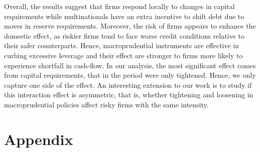 \documentclass[12pt]{article}
\begin{document}
	Overall, the results suggest that firms respond locally to changes in capital requirements while multinationals have an extra incentive to shift debt due to moves in reserve requirements. Moreover, the risk of firms appears to enhance the domestic effect, as riskier firms tend to face worse credit conditions relative to their safer counterparts. Hence, macroprudential instruments are effective in curbing excessive leverage and their effect are stronger to firms more likely to experience shortfall in cash-flow. In our analysis, the most significant effect comes from capital requirements, that in the period were only tightened. Hence, we only capture one side of the effect. An interesting extension to our work is to study if this interaction effect is asymmetric, that is, whether tightening and loosening in macroprudential policies affect risky firms with the same intensity.
	
		
	\clearpage
	
	\singlespacing
	
	
	
	
	
	
	

	
	\clearpage
	
\section*{Appendix } 
\label{sec:appendixa}
	
	\begin{small}
	{
		
	}
\end{small}

	\begin{small}
	{
		
	}
\end{small}
\end{document}
